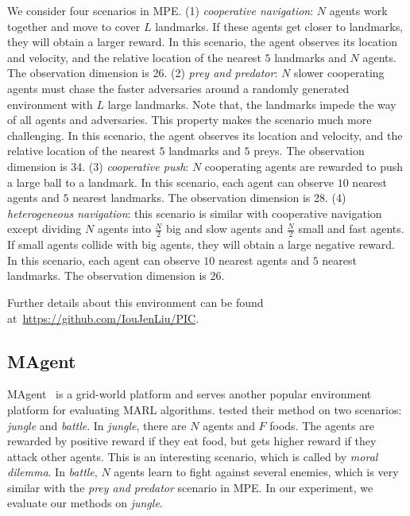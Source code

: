 \documentclass[11pt,a4paper]{article}
\theoremstyle{definition}
\begin{document}
We consider four scenarios in MPE. 
(1) \textit{cooperative navigation}: $N$ agents work together and move to cover $L$ landmarks. If these agents get closer to landmarks, they will obtain a larger reward. 
In this scenario, the agent observes its location and velocity, and the relative location of the nearest $5$ landmarks and $N$ agents. The observation dimension is 26.
(2) \textit{prey and predator}: $N$ slower cooperating agents must chase the faster adversaries around a randomly generated environment with $L$ large landmarks. Note that, the landmarks impede the way of all agents and adversaries. This property makes the scenario much more challenging. 
In this scenario, the agent observes its location and velocity, and the relative location of the nearest $5$ landmarks and $5$ preys. The observation dimension is 34.
(3) \textit{cooperative push}: $N$ cooperating agents are rewarded to push a large ball to a landmark. 
In this scenario, each agent can observe $10$ nearest agents and $5$ nearest landmarks.
The observation dimension is 28.
(4) \textit{heterogeneous navigation}: this scenario is similar with cooperative navigation except dividing $N$ agents into $\frac{N}{2}$ big and slow agents and $\frac{N}{2}$ small and fast agents. If small agents collide with big agents, they will obtain a large negative reward.
In this scenario, each agent can observe $10$ nearest agents and $5$ nearest landmarks.
The observation dimension is 26.

Further details about this environment can be found at~\url{https://github.com/IouJenLiu/PIC}.



\subsection{MAgent}

MAgent~\citep{zheng2018magent} is a grid-world platform and serves another popular environment platform for evaluating MARL algorithms.
\citet{jiang2020graph} tested their method on two scenarios: \textit{jungle} and \textit{battle}.
In \textit{jungle}, there are $N$ agents and $F$ foods. The agents are rewarded by positive reward if they eat food, but gets higher
reward if they attack other agents. 
This is an interesting scenario, which is called by \textit{moral dilemma}.
In \textit{battle}, $N$ agents learn to fight against several enemies, which is very similar with the \textit{prey and predator} scenario in MPE.
In our experiment, we evaluate our methods on \textit{jungle}.
\end{document}
